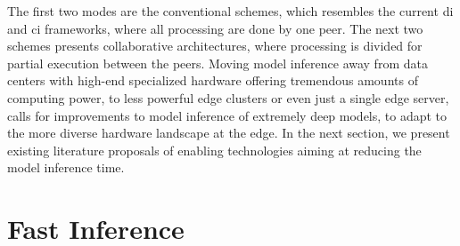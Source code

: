 The first two modes are the conventional schemes, which resembles the current \gls{di} and \gls{ci} frameworks, where all processing are done by one peer. The next two schemes presents collaborative architectures, where processing is divided for partial execution between the peers.
Moving model inference away from data centers with high-end specialized hardware offering tremendous amounts of computing power, to less powerful edge clusters or even just a single edge server, calls for improvements to model inference of extremely deep models, to adapt to the more diverse hardware landscape at the edge. In the next section, we present existing literature proposals of enabling technologies aiming at reducing the model inference time.

\section{Fast Inference} \label{sec:ei-fast-inference}

